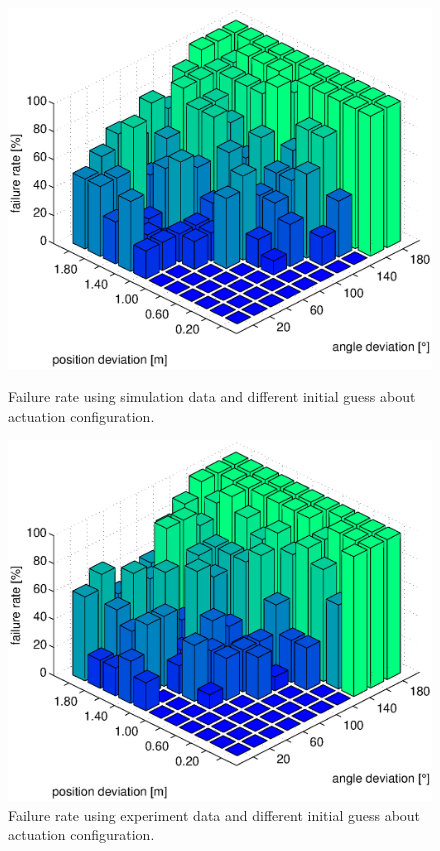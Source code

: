 \begin{figure}[hbtp]
\centering
\includegraphics[width = \textwidth]{images/results/convergence_analysis_init_deviation_sim_bar.eps}
\caption{Failure rate using simulation data and different initial guess about actuation configuration.}
\label{fig:result_sim_convergece_region}
%
\centering
\includegraphics[width = \textwidth]{images/results/convergence_analysis_init_deviation_real_bar.eps}
\caption{Failure rate using experiment data and different initial guess about actuation configuration.}
\label{fig:result_real_convergece_region}
\end{figure}

